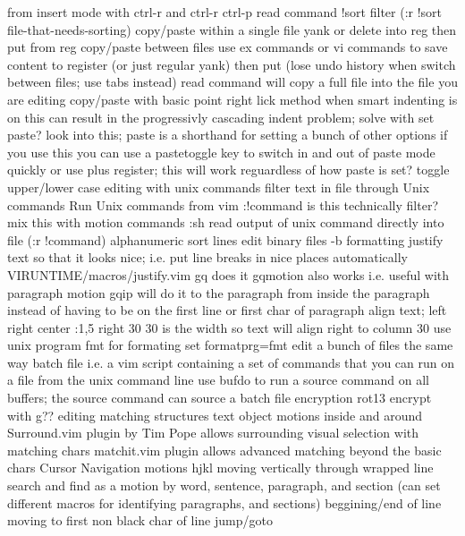 \documentclass[12pt]{book}
\begin{document}
      from insert mode with ctrl-r and ctrl-r ctrl-p
    read command
      !sort filter (:r !sort file-that-needs-sorting)
    copy/paste within a single file
      yank or delete into reg then put from reg
    copy/paste between files
      use ex commands or vi commands to save content to register (or just regular yank) then put (lose undo history when switch between files; use tabs instead)
      read command will copy a full file into the file you are editing
    copy/paste with basic point right lick method
      when smart indenting is on this can result in the progressivly cascading indent problem;
        solve with set paste?  look into this; paste is a shorthand for setting a bunch of other options
        if you use this you can use a pastetoggle key to switch in and out of paste mode quickly
        or use plus register; this will work reguardless of how paste is set?
  toggle upper/lower case
  editing with unix commands
    filter text in file through Unix commands
    Run Unix commands from vim
      :!command
        is this technically filter?
        mix this with motion commands
      :sh
      read output of unix command directly into file (:r !command)
  alphanumeric sort lines
  edit binary files -b
  formatting
    justify text so that it looks nice; i.e. put line breaks in nice places automatically
      VIRUNTIME/macros/justify.vim
      gq does it
      gqmotion also works i.e. useful with paragraph motion
      gqip will do it to the paragraph from inside the paragraph instead of having to be on the first line or first char of paragraph
    align text; left right center
      :1,5 right 30
      30 is the width so text will align right to column 30
    use unix program fmt for formating
      set formatprg=fmt
  edit a bunch of files the same way
    batch file i.e. a vim script containing a set of commands that you can run on a file from the unix command line
    use bufdo to run a source command on all buffers; the source command can source a batch file
  encryption
    rot13 encrypt with g??
  editing matching structures
    text object motions
      inside and around
    Surround.vim plugin by Tim Pope allows surrounding visual selection with matching chars
    matchit.vim plugin allows advanced matching beyond the basic chars
Cursor Navigation
  motions
    hjkl
    moving vertically through wrapped line
    search and find as a motion
    by word, sentence, paragraph, and section (can set different macros for identifying paragraphs, and sections)
    beggining/end of line
    moving to first non black char of line
    jump/goto
\end{document}
